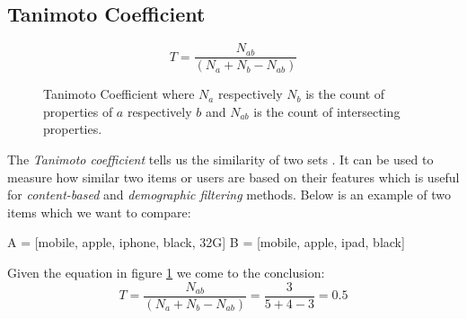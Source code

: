 \subsection{Tanimoto Coefficient}

\begin{figure}[ht]
    \[T = \frac{N_{ab}}{(N_a + N_b - N_{ab})}\]
    \caption[Tanimoto Coefficient]{Tanimoto Coefficient where \(N_a\) respectively \(N_b\) is the count of properties of \(a\) respectively \(b\) and \(N_{ab}\) is the count of intersecting properties.}
    \label{fig:tanimoto}
\end{figure}

The \textit{Tanimoto coefficient} tells us the similarity of two sets \cite{segaran07}. It can be used to measure how similar two items or users are based on their features which is useful for \textit{content-based} and \textit{demographic filtering} methods. Below is an example of two items which we want to compare:

\begin{python}
    A = [mobile, apple, iphone, black, 32G]
    B = [mobile, apple, ipad, black]
\end{python}

Given the equation in figure \ref{fig:tanimoto} we come to the conclusion: \[T = \frac{N_{ab}}{(N_a + N_b - N_{ab})} = \frac{3}{5 + 4 - 3} = 0.5\]